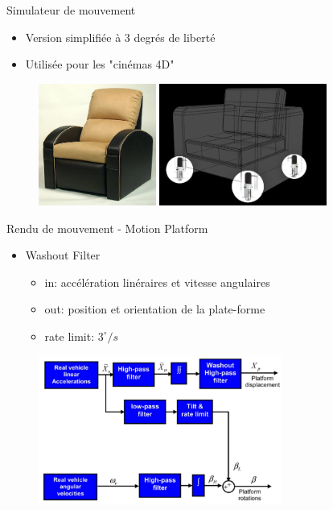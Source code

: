 {
\begin{frame}{Simulateur de mouvement}
\begin{itemize}
\item Version simplifiée à 3 degrés de liberté
\item Utilisée pour les "cinémas 4D"
\end{itemize}
\begin{figure}
\centering
\includegraphics[height=4cm]{images/dbox1}
\includegraphics[height=4cm]{images/dbox}
\end{figure}
\end{frame}
}

{
\begin{frame}{Rendu de mouvement - Motion Platform}
\begin{itemize}
\item Washout Filter
\begin{itemize}
\item in: accélération linéraires et vitesse angulaires
\item out: position et orientation de la plate-forme
\item rate limit: $3^\circ/s$
\end{itemize}
\end{itemize}
\begin{figure}
\centering
\includegraphics[width=8cm]{images/washout_filter}
\end{figure}
\end{frame}
}

